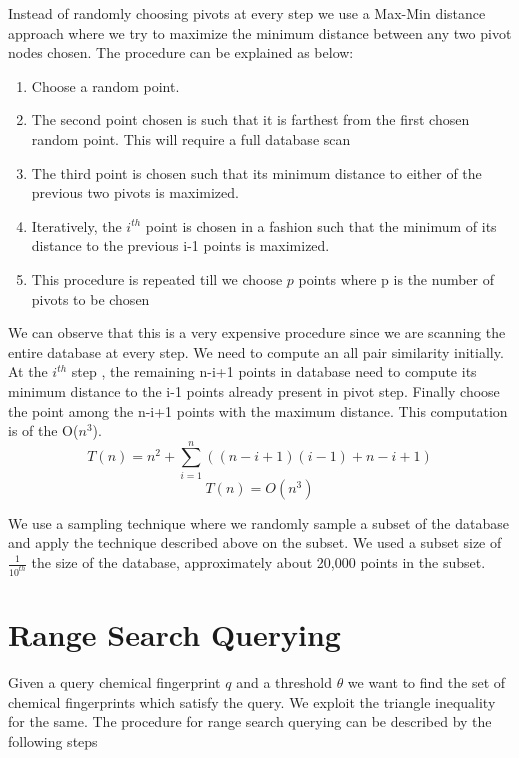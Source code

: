 Instead of randomly choosing pivots at every step we use a Max-Min distance approach where we try to maximize the minimum distance between any two pivot nodes chosen. The procedure can be explained as below:

\begin{enumerate}
	\item Choose a random point.
	\item The second point chosen is such that it is farthest from the first chosen random point. This will require a full database scan
	\item The third point is chosen such that its minimum distance to either of the previous two pivots is maximized.
	\item Iteratively, the $i^{th}$ point is chosen in a fashion such that the minimum of its distance to the previous i-1 points is maximized.
	\item This procedure is repeated till we choose $p$ points where p is the number of pivots to be chosen	\\

\end{enumerate} 

We can observe that this is a very expensive procedure since we are scanning the entire database at every step. We need to compute an all pair similarity initially. At the $i^{th}$ step , the remaining n-i+1 points in  database need to compute its minimum distance to the i-1 points already present in pivot step. Finally choose the point among the n-i+1 points with the maximum distance. This computation is of the O($n^3$).
	\[T(n)=  n^2 + \sum \limits_{i=1}^{n}( (n-i+1)(i-1)  + n-i+1) \]
	\[T(n)=O(n^3)\]

We use a sampling technique where we randomly sample a subset of the database and apply the technique described above on the subset. We used a subset size of $\frac{1}{10^{th}}$ the size of the database, approximately about 20,000 points in the subset.

\section{Range Search Querying}

Given a query chemical fingerprint $q$ and a threshold $\theta $ we want to find the set of chemical fingerprints which satisfy the query. We exploit the triangle inequality for the same. The procedure for range search querying can be described by the following steps\\

